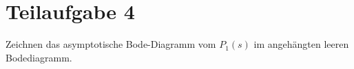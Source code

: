 \section{Teilaufgabe 4}
\begin{aufgabe}
Zeichnen das asymptotische Bode-Diagramm vom $P_1(s)$ im angehängten leeren 
Bodediagramm.
\end{aufgabe}
